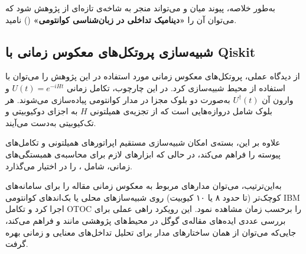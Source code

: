 به‌طور خلاصه، پیوند میان  و  می‌تواند منجر به شاخه‌ی تازه‌ای از پژوهش شود که می‌توان آن را \textbf{«دینامیک تداخلی در زبان‌شناسی کوانتومی»} () نامید.
\subsection{شبیه‌سازی پروتکل‌های معکوس زمانی با Qiskit}
\label{sec:qiskit-sim}

از دیدگاه عملی، پروتکل‌های معکوس زمانی مورد استفاده در این پژوهش را می‌توان با استفاده از محیط  شبیه‌سازی کرد.  
در این چارچوب، تکامل زمانی \( U(t) = e^{-iHt} \) و وارون آن \( U^\dagger(t) \) به‌صورت دو بلوک مجزا در مدار کوانتومی پیاده‌سازی می‌شوند.  
هر بلوک شامل دروازه‌هایی است که از تجزیه‌ی همیلتونی \(H\) به اجزای دوکیوبیتی و تک‌کیوبیتی به‌دست می‌آیند.

علاوه بر این، بسته‌ی  امکان شبیه‌سازی مستقیم اپراتورهای همیلتونی و تکامل‌های پیوسته را فراهم می‌کند،  
در حالی که  ابزارهای لازم برای محاسبه‌ی همبستگی‌های زمانی، شامل ، را در اختیار می‌گذارد.

به‌این‌ترتیب، می‌توان مدارهای مربوط به معکوس زمانی مقاله را برای سامانه‌های کوچک‌تر (تا حدود ۸ یا ۱۰ کیوبیت) روی شبیه‌سازهای محلی یا بک‌اندهای کوانتومی IBM اجرا کرد و تکامل OTOC را برحسب زمان مشاهده نمود.  
این رویکرد راهی عملی برای بررسی عددی ایده‌های مقاله‌ی گوگل در محیط‌های پژوهشی مانند  و  فراهم می‌کند، جایی‌که می‌توان از همان ساختارهای مدار برای تحلیل تداخل‌های معنایی و زمانی بهره گرفت.



